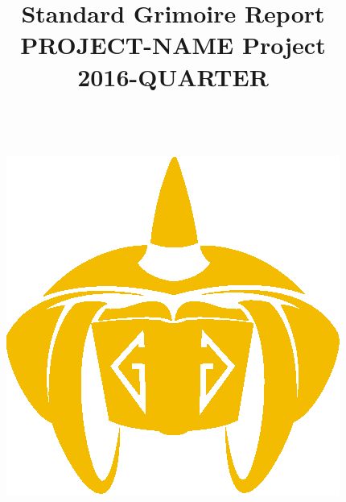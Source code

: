 \documentclass[a4wide,11pt]{article}
\begin{document}
\begin{CJK}{UTF8}{bsmi}

\title{Standard Grimoire Report \\
  PROJECT-NAME Project \\
      2016-QUARTER \\
        ~~\\~~\\  \includegraphics[scale=.35]{logo}       \\}




\maketitle


\newpage
~~\\~\\~\\~\\


~~\\~~\\

~~\\
~~\\


\end{CJK}
\end{document}
